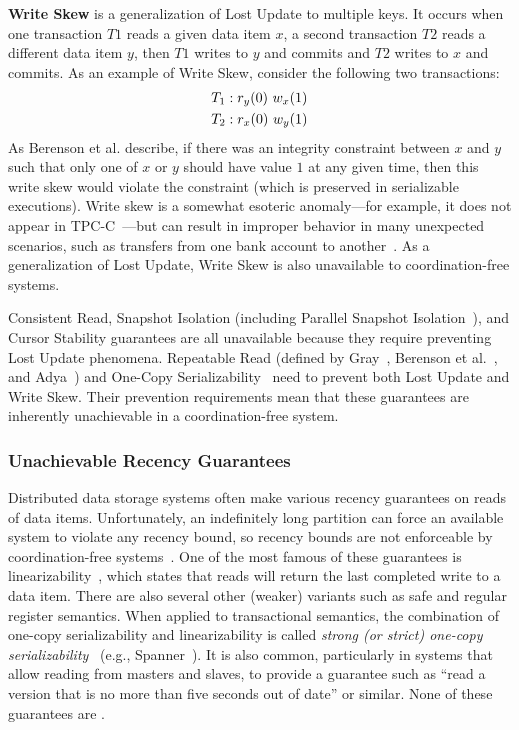 \textbf{Write Skew} is a generalization of Lost Update to multiple
keys. It occurs when one transaction $T1$ reads a given data item $x$,
a second transaction $T2$ reads a different data item $y$, then $T1$
writes to $y$ and commits and $T2$ writes to $x$ and commits. As an
example of Write Skew, consider the following two transactions:
\begin{align*}
\small
T_1 &: r_y(0)~w_x(1)
\\T_2 &: r_x(0)~w_y(1)
\end{align*}
As Berenson et al. describe, if there was an integrity constraint
between $x$ and $y$ such that only one of $x$ or $y$ should have value
$1$ at any given time, then this write skew would violate the
constraint (which is preserved in serializable executions). Write skew
is a somewhat esoteric anomaly---for example, it does not appear in
TPC-C~\cite{snapshot-serializable}---but can result in improper
behavior in many unexpected scenarios, such as transfers from one bank
account to another~\cite{snapshot-serializable}. As a generalization
of Lost Update, Write Skew is also unavailable to coordination-free systems.

Consistent Read, Snapshot Isolation (including Parallel Snapshot
Isolation~\cite{walter}), and Cursor Stability guarantees are all
unavailable because they require preventing Lost Update phenomena.
Repeatable Read (defined by Gray~\cite{gray-isolation}, Berenson et
al.~\cite{ansicritique}, and Adya~\cite{adya}) and One-Copy
Serializability~\cite{1sr} need to prevent both Lost Update and Write
Skew. Their prevention requirements mean that these guarantees are
inherently unachievable in a coordination-free system.

\subsubsection{Unachievable Recency Guarantees}

Distributed data storage systems often make various recency guarantees
on reads of data items.  Unfortunately, an indefinitely long partition
can force an available system to violate any recency bound, so recency
bounds are not enforceable by coordination-free
systems~\cite{gilbert-cap}. One of the most famous of these guarantees
is linearizability~\cite{herlihy-art}, which states that reads will
return the last completed write to a data item. There are also several
other (weaker) variants such as safe and regular register
semantics. When applied to transactional semantics, the combination of
one-copy serializability and linearizability is called \textit{strong
  (or strict) one-copy serializability}~\cite{adya} (e.g.,
Spanner~\cite{spanner}). It is also common, particularly in systems
that allow reading from masters and slaves, to provide a guarantee
such as ``read a version that is no more than five seconds out of
date'' or similar. None of these guarantees are \iconfluent.

